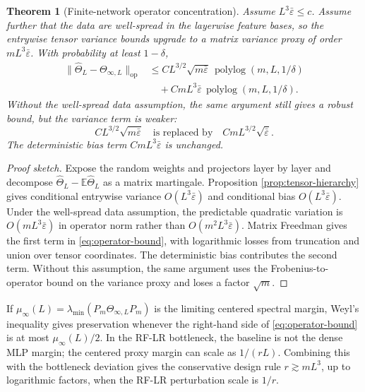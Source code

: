 \documentclass{article}
\newtheorem{theorem}{Theorem}[section]
\newcommand{\E}{\mathbb E}
\newcommand{\op}{\mathrm{op}}
\newcommand{\wh}{\widehat}
\newcommand{\barE}{\bar\varepsilon}
\begin{document}
\begin{theorem}[Finite-network operator concentration]
\label{thm:operator}
Assume \(L^3\barE\le c\). Assume further that the data are well-spread in the layerwise feature bases, so the entrywise tensor variance bounds upgrade to a matrix variance proxy of order \(mL^3\barE\). With probability at least \(1-\delta\),
\begin{equation}
\begin{aligned}
\|\wh\Theta_L-\Theta_{\infty,L}\|_{\op}
&\le
C L^{3/2}\sqrt{m\barE}\,\operatorname{polylog}(m,L,1/\delta)\\
&\quad
+C mL^3\barE\,\operatorname{polylog}(m,L,1/\delta).
\end{aligned}
\label{eq:operator-bound}
\end{equation}
Without the well-spread data assumption, the same argument still gives a robust bound, but the variance term is weaker:
\[
C L^{3/2}\sqrt{m\barE}
\quad\text{is replaced by}\quad
C mL^{3/2}\sqrt{\barE}.
\]
The deterministic bias term \(C mL^3\barE\) is unchanged.
\end{theorem}

\begin{proof}[Proof sketch]
Expose the random weights and projectors layer by layer and decompose \(\wh\Theta_L-\E\wh\Theta_L\) as a matrix martingale. Proposition \ref{prop:tensor-hierarchy} gives conditional entrywise variance \(O(L^3\barE)\) and conditional bias \(O(L^3\barE)\). Under the well-spread data assumption, the predictable quadratic variation is \(O(mL^3\barE)\) in operator norm rather than \(O(m^2L^3\barE)\). Matrix Freedman gives the first term in \eqref{eq:operator-bound}, with logarithmic losses from truncation and union over tensor coordinates. The deterministic bias contributes the second term. Without this assumption, the same argument uses the Frobenius-to-operator bound on the variance proxy and loses a factor \(\sqrt m\).
\end{proof}

If \(\mu_\infty(L)=\lambda_{\min}(P_m\Theta_{\infty,L}P_m)\) is the limiting centered spectral margin, Weyl's inequality gives preservation whenever the right-hand side of \eqref{eq:operator-bound} is at most \(\mu_\infty(L)/2\). In the RF-LR bottleneck, the baseline is not the dense MLP margin; the centered proxy margin can scale as \(1/(rL)\). Combining this with the bottleneck deviation gives the conservative design rule \(r\gtrsim mL^3\), up to logarithmic factors, when the RF-LR perturbation scale is \(1/r\).
\end{document}

